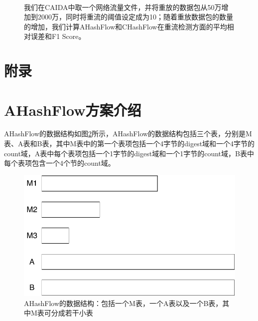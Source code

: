 \documentclass{article}
\begin{document}
\begin{figure}[ht!]
	\centering
	\mbox{
	}
	\caption{我们在CAIDA中取一个网络流量文件，并将重放的数据包从50万增加到2000万，同时将重流的阈值设定成为10；随着重放数据包的数量的增加，我们计算AHashFlow和CHashFlow在重流检测方面的平均相对误差和F1 Score。}
	\label{fig:hh_dection_various_pkt_number}
\end{figure}



\appendix
\section*{附录}
\section{AHashFlow方案介绍}
AHashFlow的数据结构如图\ref{fig:ahashflow}所示，AHashFlow的数据结构包括三个表，分别是M表、A表和B表，其中M表中的第一个表项包括一个4字节的digest域和一个4字节的count域，A表中每个表项包括一个1字节的digest域和一个1字节的count域，B表中每个表项包含一个4个节的count域。
\begin{figure}[ht!]
	\centering
	\includegraphics[width=0.7\linewidth]{./figures/AHashFlowDataStructure/AHashFlow}
	\caption{AHashFlow的数据结构：包括一个M表，一个A表以及一个B表，其中M表可分成若干小表}
	\label{fig:ahashflow}
\end{figure}
\end{document}
